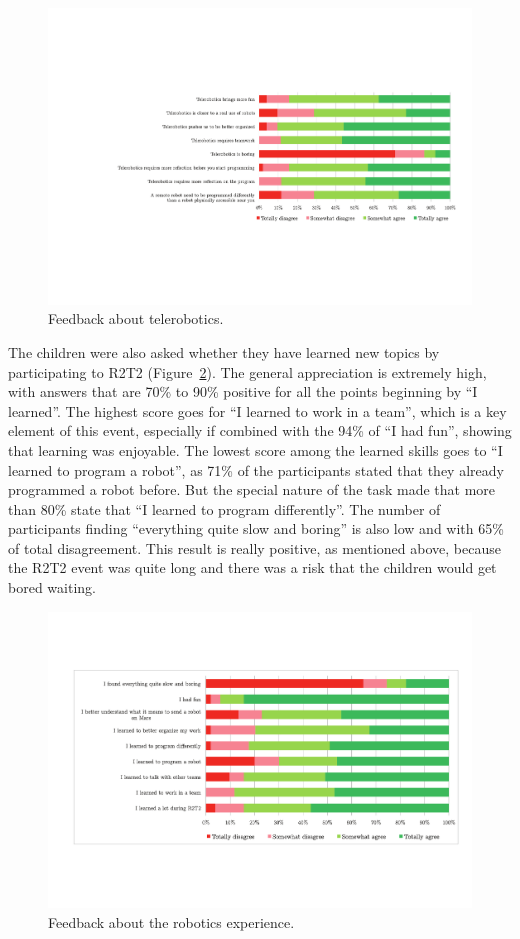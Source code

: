 \documentclass{intech-journal}
\begin{document}
\begin{figure}[ht]
 \centering
    \includegraphics[width=\columnwidth]{figures/telerobotics.pdf}
  \caption{Feedback about telerobotics.}
  \label{fig:tele} 
\end{figure}

The children were also asked whether they have learned new topics by participating to R2T2 (Figure~\ref{fig:robotics}). 
The general appreciation is extremely high, with answers that are 70\% to 90\% positive for all the points beginning by ``I learned''. 
The highest score goes for ``I learned to work in a team'', which is a key element of this event, especially if combined with the 94\% of ``I had fun'', showing that learning was enjoyable.
The lowest score among the learned skills goes to ``I learned to program a robot'', as 71\% of the participants stated that they already programmed a robot before.
But the special nature of the task made that more than 80\% state that ``I learned to program differently''.
The number of participants finding ``everything quite slow and boring'' is also low and with 65\% of total disagreement. 
This result is really positive, as mentioned above, because the R2T2 event was quite long and there was a risk that the children would get bored waiting. 

\begin{figure}[ht]
 \centering
    \includegraphics[width=0.9\columnwidth]{figures/robotics.pdf}
  \caption{Feedback about the robotics experience.}
  \label{fig:robotics} 
\end{figure}
\end{document}
